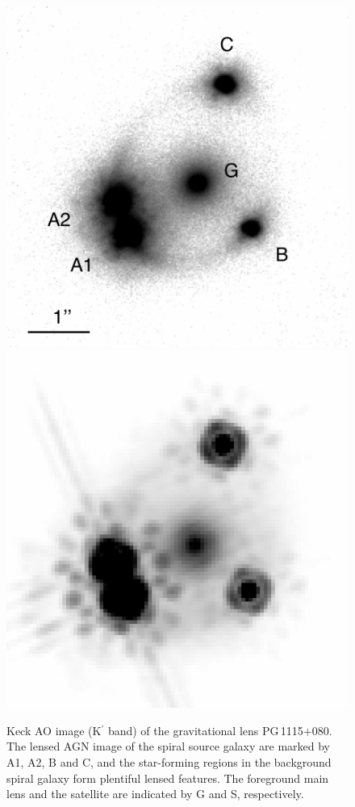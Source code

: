 \documentclass[useAMS,usenatbib]{mnras}
\newcommand\pg{PG\,1115$+$080}
\begin{document}
\begin{figure}
\includegraphics*[scale=0.5]{PG1115_AOnew.png}
\includegraphics*[scale=0.61]{PG1115_HSTnew.png}
\caption{Keck AO image (K$^\prime$ band) of the gravitational lens \pg. The lensed AGN image  of the spiral source galaxy are marked by A1, A2, B and C, and the star-forming regions in the background spiral galaxy form plentiful lensed features. The foreground main lens and the satellite are indicated by G and S, respectively.}
\label{fig:PG1115image}
\end{figure}
\end{document}

